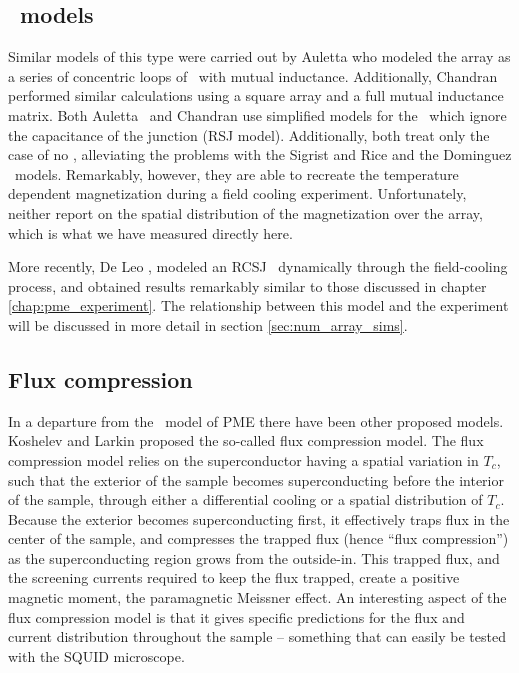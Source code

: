 \subsection{\jja\ models}

Similar models of this
type were carried out by Auletta \etal\cite{auletta_prb_49_12311_1994}
who modeled the array as a series of concentric loops of \jjsnoun\  
with mutual
inductance. Additionally, Chandran\cite{chandran_prb_56_6169_1997}
performed similar calculations using a square array and a full
mutual inductance matrix. 
Both Auletta \etal\ and Chandran use 
simplified models for the \jjsnoun\
which ignore the capacitance of the
junction (RSJ model). 
Additionally, both treat only the case of no \pijunctions, 
alleviating the problems with the Sigrist and Rice and the Dominguez \etal\
models. 
Remarkably, however, they are able to recreate the 
temperature dependent magnetization during a field cooling experiment. 
Unfortunately, neither report on the spatial distribution of the
magnetization over the array, which is what we have measured directly
here. 

More recently, De Leo \etal\cite{deleo_unpublished}, modeled 
an RCSJ \jja\ dynamically through the field-cooling process, and 
obtained results remarkably similar to those discussed in 
chapter \ref{chap:pme_experiment}. The relationship between this model
and the experiment will be discussed in more detail in section
\ref{sec:num_array_sims}. 

\subsection{Flux compression}

In a departure from the \jja\ model of PME there have been other
proposed models. Koshelev and Larkin\cite{koshelev_prb_53_13559_1995}
proposed the so-called flux compression model. 
The flux compression model relies on the superconductor having a 
spatial variation in $T_c$, such that the exterior of the sample
becomes superconducting before the interior of the sample, through
either a differential cooling or a spatial distribution of 
$T_c$. Because the exterior becomes superconducting first, it 
effectively traps flux in the center of the sample, and compresses
the trapped flux (hence ``flux compression'') as the 
superconducting region grows
from the outside-in. This trapped flux, and the
screening currents required to keep the flux trapped, create
a positive magnetic moment, the paramagnetic Meissner effect.
An interesting aspect of the flux compression model is that it gives
specific predictions for the flux and current distribution
throughout the sample -- something that can easily be tested with
the SQUID microscope. 

